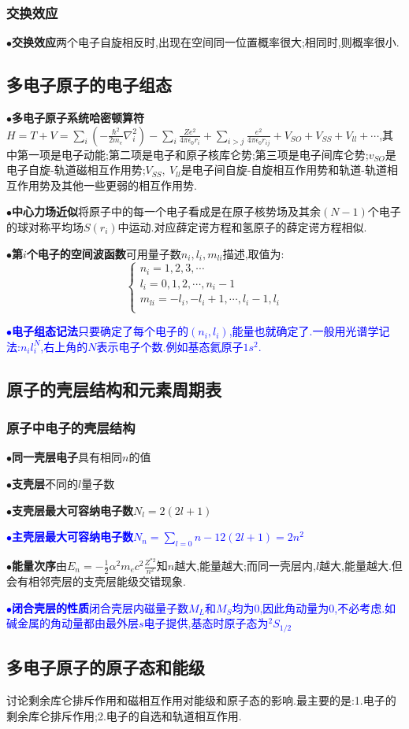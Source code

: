 \documentclass[UTF8]{article}
\newcommand{\keypoint}[2]{$\bullet$\textbf{#1}\quad#2\par}
\begin{document}
\subsubsection{交换效应}
\keypoint{交换效应}{两个电子自旋相反时,出现在空间同一位置概率很大;相同时,则概率很小.}
\subsection{多电子原子的电子组态}
\keypoint{多电子原子系统哈密顿算符}{$H=T+V=\sum\limits_{i}^{}\left(-\frac{\hbar^2}{2m_e}\nabla_i^2\right)-\sum\limits_{i}^{}\frac{Ze^2}{4\pi\epsilon_{0}r_i}+\sum\limits_{i>j}^{}\frac{e^2}{4\pi\epsilon_{0}r_{ij}}+V_{SO}+V_{SS}+V_{ll}+\cdots$,其中第一项是电子动能;第二项是电子和原子核库仑势;第三项是电子间库仑势;$v_{SO}$是电子自旋-轨道磁相互作用势;$V_{SS},\ V_{ll}$是电子间自旋-自旋相互作用势和轨道-轨道相互作用势及其他一些更弱的相互作用势.}
\keypoint{中心力场近似}{将原子中的每一个电子看成是在原子核势场及其余$(N-1)$个电子的球对称平均场$S(r_i)$中运动.对应薛定谔方程和氢原子的薛定谔方程相似.}
\keypoint{第$i$个电子的空间波函数}{可用量子数$n_i,l_i,m_{li}$描述,取值为:
	$$\left\{
		\begin{array}{l}
		n_i=1,2,3,\cdots\\
		l_i=0,1,2,\cdots,n_i-1\\
		m_{li}=-l_i,-l_i+1,\cdots,l_i-1,l_i\\
		\end{array}
	\right. $$
}
\textcolor{blue}{\keypoint{电子组态记法}{只要确定了每个电子的$(n_i,l_i)$,能量也就确定了.一般用光谱学记法:$n_il_i^N$,右上角的$N$表示电子个数.例如基态氦原子$1s^2$.}}
\subsection{原子的壳层结构和元素周期表}
\subsubsection{原子中电子的壳层结构}
\keypoint{同一壳层电子}{具有相同$n$的值}
\keypoint{支壳层}{不同的$l$量子数}
\keypoint{支壳层最大可容纳电子数}{$N_l=2(2l+1)$}
\textcolor{blue}{\keypoint{主壳层最大可容纳电子数}{$N_n=\sum\limits_{l=0}{n-1}2(2l+1)=2n^2$}}
\keypoint{能量次序}{由$E_n=-\frac{1}{2}\alpha^2m_ec^2\frac{Z^{*2}}{n^2}$知$n$越大,能量越大;而同一壳层内,$l$越大,能量越大.但会有相邻壳层的支壳层能级交错现象.}
\textcolor{blue}{\keypoint{闭合壳层的性质}{闭合壳层内磁量子数$M_L$和$M_S$均为0,因此角动量为0,不必考虑.如碱金属的角动量都由最外层$s$电子提供,基态时原子态为$^2S_{1/2}$}}
\subsection{多电子原子的原子态和能级}
讨论剩余库仑排斥作用和磁相互作用对能级和原子态的影响.最主要的是:1.电子的剩余库仑排斥作用;2.电子的自选和轨道相互作用.
\end{document}
